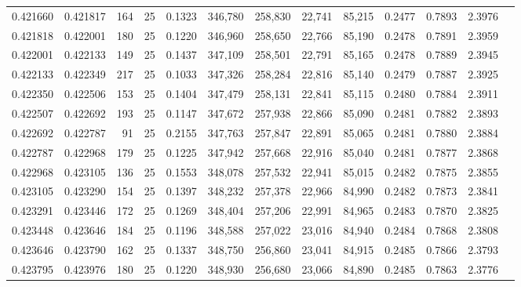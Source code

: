 \begin{tabular}{rrrrrrrrrrrrr}
0.421660 & 0.421817 &   164 &  25 &                                     0.1323 & 346,780 & 258,830 &  22,741 &  85,215 & 0.2477 & 0.7893 & 2.3976 \\
0.421818 & 0.422001 &   180 &  25 &                                     0.1220 & 346,960 & 258,650 &  22,766 &  85,190 & 0.2478 & 0.7891 & 2.3959 \\
0.422001 & 0.422133 &   149 &  25 &                                     0.1437 & 347,109 & 258,501 &  22,791 &  85,165 & 0.2478 & 0.7889 & 2.3945 \\
0.422133 & 0.422349 &   217 &  25 &                                     0.1033 & 347,326 & 258,284 &  22,816 &  85,140 & 0.2479 & 0.7887 & 2.3925 \\
0.422350 & 0.422506 &   153 &  25 &                                     0.1404 & 347,479 & 258,131 &  22,841 &  85,115 & 0.2480 & 0.7884 & 2.3911 \\
0.422507 & 0.422692 &   193 &  25 &                                     0.1147 & 347,672 & 257,938 &  22,866 &  85,090 & 0.2481 & 0.7882 & 2.3893 \\
0.422692 & 0.422787 &    91 &  25 &                                     0.2155 & 347,763 & 257,847 &  22,891 &  85,065 & 0.2481 & 0.7880 & 2.3884 \\
0.422787 & 0.422968 &   179 &  25 &                                     0.1225 & 347,942 & 257,668 &  22,916 &  85,040 & 0.2481 & 0.7877 & 2.3868 \\
0.422968 & 0.423105 &   136 &  25 &                                     0.1553 & 348,078 & 257,532 &  22,941 &  85,015 & 0.2482 & 0.7875 & 2.3855 \\
0.423105 & 0.423290 &   154 &  25 &                                     0.1397 & 348,232 & 257,378 &  22,966 &  84,990 & 0.2482 & 0.7873 & 2.3841 \\
0.423291 & 0.423446 &   172 &  25 &                                     0.1269 & 348,404 & 257,206 &  22,991 &  84,965 & 0.2483 & 0.7870 & 2.3825 \\
0.423448 & 0.423646 &   184 &  25 &                                     0.1196 & 348,588 & 257,022 &  23,016 &  84,940 & 0.2484 & 0.7868 & 2.3808 \\
0.423646 & 0.423790 &   162 &  25 &                                     0.1337 & 348,750 & 256,860 &  23,041 &  84,915 & 0.2485 & 0.7866 & 2.3793 \\
0.423795 & 0.423976 &   180 &  25 &                                     0.1220 & 348,930 & 256,680 &  23,066 &  84,890 & 0.2485 & 0.7863 & 2.3776 \\

\end{tabular}
